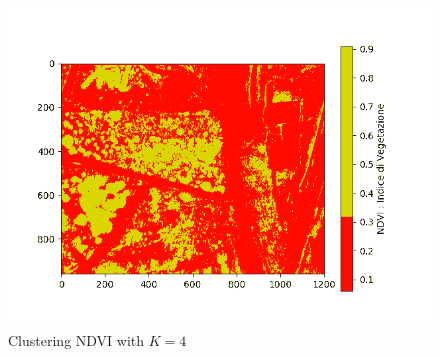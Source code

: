 \documentclass[a4paper,11pt,oneside]{book}
\begin{document}
\begin{figure}[H]
	\centering
	\includegraphics[width=12 cm]{clusteringNDVI.jpg}
	\caption{Clustering NDVI with $K=4$}
\end{figure}
\end{document}

